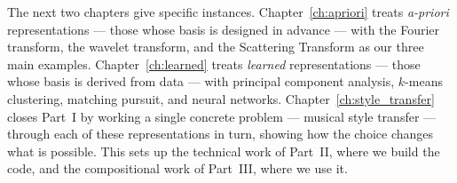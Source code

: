 \noindent The next two chapters give specific instances.
Chapter~\ref{ch:apriori} treats \emph{a-priori} representations --- those
whose basis is designed in advance --- with the Fourier transform, the
wavelet transform, and the Scattering Transform as our three main
examples.  Chapter~\ref{ch:learned} treats \emph{learned} representations
--- those whose basis is derived from data --- with principal component
analysis, $k$-means clustering, matching pursuit, and neural networks.
Chapter~\ref{ch:style_transfer} closes Part~\textsc{I} by working a
single concrete problem --- musical style transfer --- through each of
these representations in turn, showing how the choice changes what is
possible.  This sets up the technical work of Part~\textsc{II}, where we
build the code, and the compositional work of Part~\textsc{III}, where
we use it.
